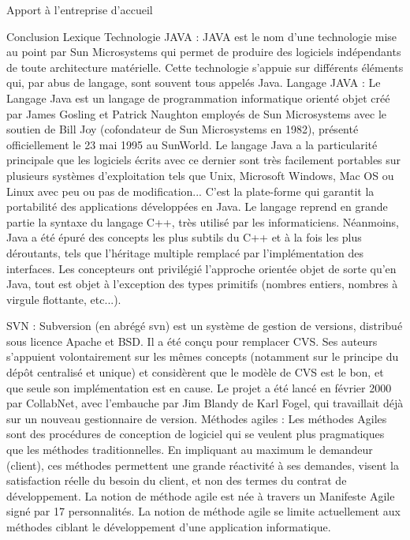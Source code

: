 \documentclass{article}
\begin{document}
Apport à l'entreprise d'accueil


Conclusion
Lexique
Technologie JAVA : JAVA est le nom d'une technologie mise au point par Sun Microsystems qui permet de produire des logiciels indépendants de toute architecture matérielle. Cette technologie s'appuie sur différents éléments qui, par abus de langage, sont souvent tous appelés Java.
Langage JAVA : Le Langage Java est un langage de programmation informatique orienté objet créé par James Gosling et Patrick Naughton employés de Sun Microsystems avec le soutien de Bill Joy (cofondateur de Sun Microsystems en 1982), présenté officiellement le 23 mai 1995 au SunWorld. Le langage Java a la particularité principale que les logiciels écrits avec ce dernier sont très facilement portables sur plusieurs systèmes d'exploitation tels que Unix, Microsoft Windows, Mac OS ou Linux avec peu ou pas de modification... C'est la plate-forme qui garantit la portabilité des applications développées en Java. Le langage reprend en grande partie la syntaxe du langage C++, très utilisé par les informaticiens. Néanmoins, Java a été épuré des concepts les plus subtils du C++ et à la fois les plus déroutants, tels que l'héritage multiple remplacé par l'implémentation des interfaces. Les concepteurs ont privilégié l'approche orientée objet de sorte qu'en Java, tout est objet à l'exception des types primitifs (nombres entiers, nombres à virgule flottante, etc...).

SVN : Subversion (en abrégé svn) est un système de gestion de versions, distribué sous licence Apache et BSD. Il a été conçu pour remplacer CVS. Ses auteurs s'appuient volontairement sur les mêmes concepts (notamment sur le principe du dépôt centralisé et unique) et considèrent que le modèle de CVS est le bon, et que seule son implémentation est en cause. Le projet a été lancé en février 2000 par CollabNet, avec l'embauche par Jim Blandy de Karl Fogel, qui travaillait déjà sur un nouveau gestionnaire de version. 
Méthodes agiles : Les méthodes Agiles sont des procédures de conception de logiciel qui se veulent plus pragmatiques que les méthodes traditionnelles. En impliquant au maximum le demandeur (client), ces méthodes permettent une grande réactivité à ses demandes, visent la satisfaction réelle du besoin du client, et non des termes du contrat de développement. La notion de méthode agile est née à travers un Manifeste Agile signé par 17 personnalités. La notion de méthode agile se limite actuellement aux méthodes ciblant le développement d'une application informatique.
\end{document}
